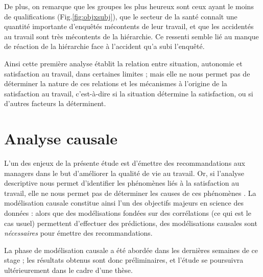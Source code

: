 \documentclass[11pt,fleqn,openany,frenchb]{book} %
\def\NOTE#1{\footnote{MS : #1}}
\begin{document}
De plus, on remarque que les groupes les plus heureux sont ceux ayant le moins de qualifications (Fig.\ref{fig:objxsubj}), que le secteur de la santé connaît une quantité importante d'enquêtés mécontents de leur travail, et que les accidentés au travail sont très mécontents de la hiérarchie. Ce ressenti semble lié au manque de réaction de la hiérarchie face à l'accident qu'a subi l'enquêté.\par

Ainsi cette première analyse établit la relation entre situation, autonomie et satisfaction au travail, dans certaines limites ; mais elle ne nous permet pas de déterminer la nature de ces relations et les mécanismes à l'origine de la satisfaction au travail, c'est-à-dire si la situation détermine la satisfaction, ou si d'autres facteurs la déterminent.
\chapter{Analyse causale}
L'un des enjeux de la présente étude est d'émettre des recommandations aux managers dans le but d'améliorer la qualité de vie au travail. Or, si l'analyse descriptive nous permet d'identifier les phénomènes liés à la satisfaction au travail, elle ne nous permet pas de déterminer les causes de ces phénomènes \cite{pearl2000causal}. La modélisation causale constitue ainsi l'un des objectifs majeurs en science des données : alors que des modélisations fondées sur des corrélations (ce qui est le cas usuel) permettent d'effectuer des prédictions, des modélisations causales sont {\em nécessaires} pour émettre des recommandations. 

La phase de modélisation causale a été abordée dans les dernières semaines de ce stage ; les résultats obtenus sont donc préliminaires, et l'étude se poursuivra ultérieurement dans le cadre d'une thèse. \par
 
\end{document}
